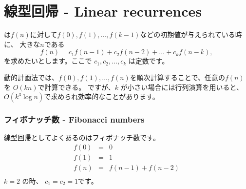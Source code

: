 \section{線型回帰 - Linear recurrences}


は$f(n)$に対して$f(0),f(1),\ldots,f(k-1)$などの初期値が与えられている時に、
大きな$n$である
\[f(n) = c_1 f(n-1) + c_2 f(n-2) + \ldots + c_k f (n-k),\]
を求めたいとします。ここで $c_1,c_2,\ldots,c_k$ は定数です。

動的計画法では、$f(0),f(1),\ldots,f(n)$を順次計算することで、任意の$f(n)$を $O(kn)$で計算できる。
ですが、$k$ が小さい場合には行列演算を用いると、$O(k^3 \log n)$で求められ効率的なことがあります。

\subsubsection{フィボナッチ数 - Fibonacci numbers}


線型回帰としてよくあるのはフィボナッチ数です。
\[
\begin{array}{lcl}
f(0) & = & 0 \\
f(1) & = & 1 \\
f(n) & = & f(n-1)+f(n-2) \\
\end{array}
\]
$k=2$ の時、 $c_1=c_2=1$です。

